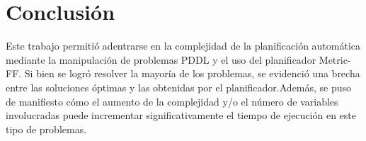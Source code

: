 \documentclass{article}
\begin{document}
\section{Conclusión}
Este trabajo permitió adentrarse en la complejidad de la planificación automática mediante la manipulación de problemas PDDL y 
el uso del planificador Metric-FF. Si bien se logró resolver la mayoría de los problemas, se evidenció una brecha entre las
 soluciones óptimas y las obtenidas por el planificador.Además, se puso de manifiesto cómo el aumento de la complejidad y/o el número de variables involucradas puede incrementar significativamente el tiempo de ejecución en este tipo de problemas.
\end{document}
